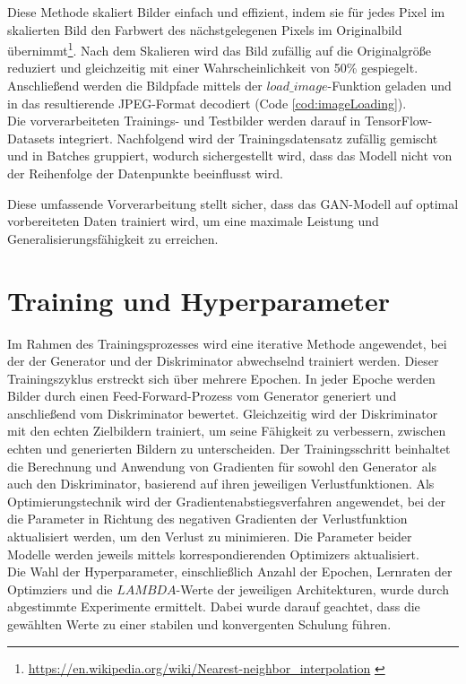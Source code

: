 Diese Methode skaliert Bilder einfach und effizient, indem sie für jedes Pixel im skalierten Bild den Farbwert des nächstgelegenen Pixels im Originalbild übernimmt\footnote{\url{https://en.wikipedia.org/wiki/Nearest-neighbor_interpolation} \label{note:nearestNeighbor}}.
Nach dem Skalieren wird das Bild zufällig auf die Originalgröße reduziert und gleichzeitig mit einer Wahrscheinlichkeit von 50\% gespiegelt.
Anschließend werden die Bildpfade mittels der $load\_image$-Funktion geladen und in das resultierende JPEG-Format decodiert (Code \ref{cod:imageLoading}).
\\\newline
Die vorverarbeiteten Trainings- und Testbilder werden darauf in TensorFlow-Datasets integriert. Nachfolgend wird der Trainingsdatensatz zufällig gemischt und in Batches gruppiert, wodurch sichergestellt wird, dass das Modell nicht von der Reihenfolge der Datenpunkte beeinflusst wird.


Diese umfassende Vorverarbeitung stellt sicher, dass das GAN-Modell auf optimal vorbereiteten Daten trainiert wird, um eine maximale Leistung und Generalisierungsfähigkeit zu erreichen.





\section{Training und Hyperparameter}

Im Rahmen des Trainingsprozesses wird eine iterative Methode angewendet, bei der der Generator und der Diskriminator abwechselnd trainiert werden. Dieser Trainingszyklus erstreckt sich über mehrere Epochen. In jeder Epoche werden Bilder durch einen Feed-Forward-Prozess vom Generator generiert und anschließend vom Diskriminator bewertet. Gleichzeitig wird der Diskriminator mit den echten Zielbildern trainiert, um seine Fähigkeit zu verbessern, zwischen echten und generierten Bildern zu unterscheiden. Der Trainingsschritt beinhaltet die Berechnung und Anwendung von Gradienten für sowohl den Generator als auch den Diskriminator, basierend auf ihren jeweiligen Verlustfunktionen.
Als Optimierungstechnik wird der Gradientenabstiegsverfahren angewendet, bei der die Parameter in Richtung des negativen Gradienten der Verlustfunktion aktualisiert werden, um den Verlust zu minimieren. Die Parameter beider Modelle werden jeweils mittels korrespondierenden Optimizers aktualisiert.
\\\newline
Die Wahl der Hyperparameter, einschließlich Anzahl der Epochen, Lernraten der Optimziers und die $LAMBDA$-Werte der jeweiligen Architekturen, wurde durch abgestimmte Experimente ermittelt. Dabei wurde darauf geachtet, dass die gewählten Werte zu einer stabilen und konvergenten Schulung führen.

